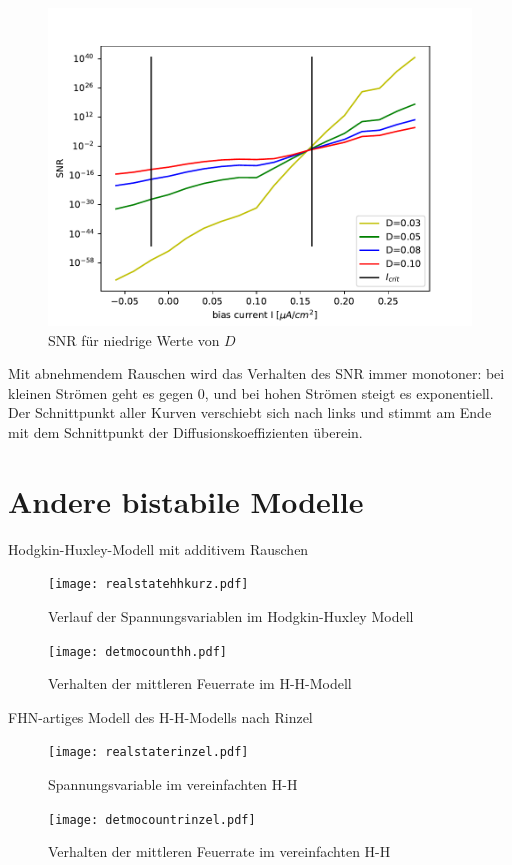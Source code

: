 \documentclass[12pt,a4paper]{article}
\begin{document}
\begin{figure}[H]
	\centering
	\includegraphics[scale=1]{SNRpred.pdf}\caption{SNR für niedrige Werte von $D$}
	\label{snrpred}
\end{figure}
Mit abnehmendem Rauschen wird das Verhalten des SNR immer monotoner: bei kleinen Strömen geht es gegen 0, und bei hohen Strömen steigt es exponentiell. Der Schnittpunkt aller Kurven verschiebt sich nach links und stimmt am Ende mit dem Schnittpunkt der Diffusionskoeffizienten überein.
\section{Andere bistabile Modelle}
Hodgkin-Huxley-Modell mit additivem Rauschen
\begin{figure}[H]
	\centering
	\texttt{[image: realstatehhkurz.pdf]}\caption{Verlauf der Spannungsvariablen im Hodgkin-Huxley Modell}
	\label{hhvolt}
\end{figure}
\begin{figure}[H]
	\centering
	\texttt{[image: detmocounthh.pdf]}\caption{Verhalten der mittleren Feuerrate im H-H-Modell}
	\label{hhcount}
\end{figure}
FHN-artiges Modell des H-H-Modells nach Rinzel
\begin{figure}[H]
	\centering
	\texttt{[image: realstaterinzel.pdf]}\caption{Spannungsvariable im vereinfachten H-H}
	\label{rinzelvolt}
\end{figure}
\begin{figure}[H]
	\centering
	\texttt{[image: detmocountrinzel.pdf]}\caption{Verhalten der mittleren Feuerrate im vereinfachten H-H}
	\label{rinzelcount}
\end{figure}
\end{document}
